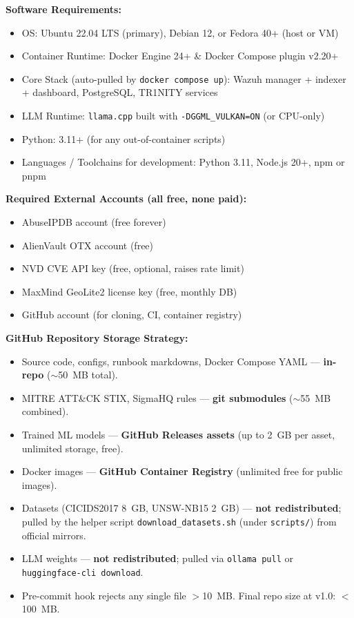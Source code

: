 \documentclass[11pt,a4paper]{article}
\begin{document}
\noindent\textbf{Software Requirements:}
\begin{itemize}[leftmargin=*, itemsep=2pt]
  \item OS: Ubuntu 22.04 LTS (primary), Debian 12, or Fedora 40+ (host or VM)
  \item Container Runtime: Docker Engine 24+ \& Docker Compose plugin v2.20+
  \item Core Stack (auto-pulled by \texttt{docker compose up}): Wazuh manager + indexer + dashboard, PostgreSQL, TR1NITY services
  \item LLM Runtime: \texttt{llama.cpp} built with \texttt{-DGGML\_VULKAN=ON} (or CPU-only)
  \item Python: 3.11+ (for any out-of-container scripts)
  \item Languages / Toolchains for development: Python 3.11, Node.js 20+, npm or pnpm
\end{itemize}

\noindent\textbf{Required External Accounts (all free, none paid):}
\begin{itemize}[leftmargin=*, itemsep=2pt]
  \item AbuseIPDB account (free forever)
  \item AlienVault OTX account (free)
  \item NVD CVE API key (free, optional, raises rate limit)
  \item MaxMind GeoLite2 license key (free, monthly DB)
  \item GitHub account (for cloning, CI, container registry)
\end{itemize}

\noindent\textbf{GitHub Repository Storage Strategy:}
\begin{itemize}[leftmargin=*, itemsep=2pt]
  \item Source code, configs, runbook markdowns, Docker Compose YAML — \textbf{in-repo} ($\sim$50~MB total).
  \item MITRE ATT\&CK STIX, SigmaHQ rules — \textbf{git submodules} ($\sim$55~MB combined).
  \item Trained ML models — \textbf{GitHub Releases assets} (up to 2~GB per asset, unlimited storage, free).
  \item Docker images — \textbf{GitHub Container Registry} (unlimited free for public images).
  \item Datasets (CICIDS2017 8~GB, UNSW-NB15 2~GB) — \textbf{not redistributed}; pulled by the helper script \texttt{download\_datasets.sh} (under \texttt{scripts/}) from official mirrors.
  \item LLM weights — \textbf{not redistributed}; pulled via \texttt{ollama pull} or \texttt{huggingface-cli download}.
  \item Pre-commit hook rejects any single file $>$10~MB. Final repo size at v1.0: $<$100~MB.
\end{itemize}
\end{document}

